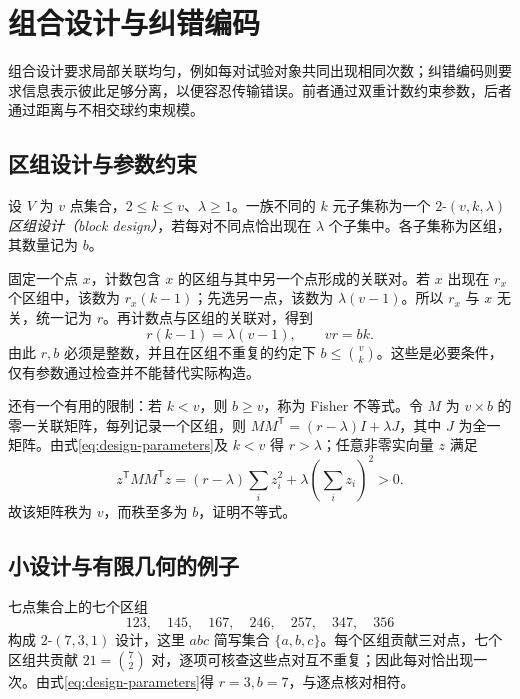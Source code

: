\setcounter{chapter}{15} %
\chapter{组合设计与纠错编码}
\label{ch:designs-codes}

组合设计要求局部关联均匀，例如每对试验对象共同出现相同次数；纠错编码则要求信息表示彼此足够分离，以便容忍传输错误。前者通过双重计数约束参数，后者通过距离与不相交球约束规模。

\section{区组设计与参数约束}

\begin{definition}
设 $V$ 为 $v$ 点集合，$2\le k\le v$、$\lambda\ge1$。一族不同的 $k$ 元子集称为一个 $2$-$(v,k,\lambda)$ \emph{区组设计（block design）}，若每对不同点恰出现在 $\lambda$ 个子集中。各子集称为区组，其数量记为 $b$。
\end{definition}

固定一个点 $x$，计数包含 $x$ 的区组与其中另一个点形成的关联对。若 $x$ 出现在 $r_x$ 个区组中，该数为 $r_x(k-1)$；先选另一点，该数为 $\lambda(v-1)$。所以 $r_x$ 与 $x$ 无关，统一记为 $r$。再计数点与区组的关联对，得到
\begin{equation}
 r(k-1)=\lambda(v-1),\qquad vr=bk.
 \label{eq:design-parameters}
\end{equation}
由此 $r,b$ 必须是整数，并且在区组不重复的约定下 $b\le\binom vk$。这些是必要条件，仅有参数通过检查并不能替代实际构造。

还有一个有用的限制：若 $k<v$，则 $b\ge v$，称为 Fisher 不等式。令 $M$ 为 $v\times b$ 的零一关联矩阵，每列记录一个区组，则 $MM^{\mathsf T}=(r-\lambda)I+\lambda J$，其中 $J$ 为全一矩阵。由式\eqref{eq:design-parameters}及 $k<v$ 得 $r>\lambda$；任意非零实向量 $z$ 满足
\[
 z^{\mathsf T}MM^{\mathsf T}z=(r-\lambda)\sum_i z_i^2+
                       \lambda\left(\sum_i z_i\right)^2>0.
\]
故该矩阵秩为 $v$，而秩至多为 $b$，证明不等式。

\section{小设计与有限几何的例子}

七点集合上的七个区组
\[
 123,\quad145,\quad167,\quad246,\quad257,\quad347,\quad356
\]
构成 $2$-$(7,3,1)$ 设计，这里 $abc$ 简写集合 $\{a,b,c\}$。每个区组贡献三对点，七个区组共贡献 $21=\binom72$ 对，逐项可核查这些点对互不重复；因此每对恰出现一次。由式\eqref{eq:design-parameters}得 $r=3,b=7$，与逐点核对相符。

